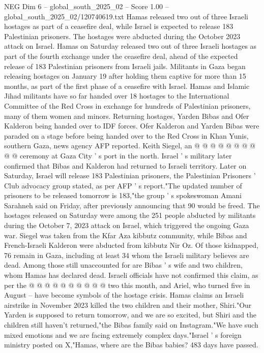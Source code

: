 \begin{textsample}{NEG Dim 6 – global\_south\_2025\_02 – Score 1.00 – global\_south\_2025\_02/120740619.txt}  \label{ex:f6_neg_041}
Hamas released two out of three Israeli hostages as part of a ceasefire deal, while Israel is expected to release 183 Palestinian prisoners.
The hostages were abducted during the October 2023 attack on Israel.
Hamas on Saturday released two out of three Israeli hostages as part of the fourth exchange under the ceasefire deal, ahead of the expected release of 183 Palestinian prisoners from Israeli jails.
Militants in Gaza began releasing hostages on January 19 after holding them captive for more than 15 months, as part of the first phase of a ceasefire with Israel.
Hamas and Islamic Jihad militants have so far handed over 18 hostages to the International Committee of the Red Cross in exchange for hundreds of Palestinian prisoners, many of them women and minors.
Returning hostages, Yarden Bibas and Ofer Kalderon being handed over to IDF forces.
Ofer Kalderon and Yarden Bibas were paraded on a stage before being handed over to the Red Cross in Khan Yunis, southern Gaza, news agency AFP reported.
Keith Siegel, an @ @ @ @ @ @ @ @ @ @ ceremony at Gaza City ' s port in the north.
Israel ' s military later confirmed that Bibas and Kalderon had returned to Israeli territory.
Later on Saturday, Israel will release 183 Palestinian prisoners, the Palestinian Prisoners ' Club advocacy group stated, as per AFP ' s report."The updated number of prisoners to be released tomorrow is 183,"the group ' s spokeswoman Amani Sarahneh said on Friday, after previously announcing that 90 would be freed.
The hostages released on Saturday were among the 251 people abducted by militants during the October 7, 2023 attack on Israel, which triggered the ongoing Gaza war.
Siegel was taken from the Kfar Aza kibbutz community, while Bibas and French-Israeli Kalderon were abducted from kibbutz Nir Oz.
Of those kidnapped, 76 remain in Gaza, including at least 34 whom the Israeli military believes are dead.
Among those still unaccounted for are Bibas ' s wife and two children, whom Hamas has declared dead.
Israeli officials have not confirmed this claim, as per the @ @ @ @ @ @ @ @ @ @ two this month, and Ariel, who turned five in August -- have become symbols of the hostage crisis.
Hamas claims an Israeli airstrike in November 2023 killed the two children and their mother, Shiri."Our Yarden is supposed to return tomorrow, and we are so excited, but Shiri and the children still haven't returned,"the Bibas family said on Instagram."We have such mixed emotions and we are facing extremely complex days."Israel ' s foreign ministry posted on X,"Hamas, where are the Bibas babies? 483 days have passed.

\end{textsample}
